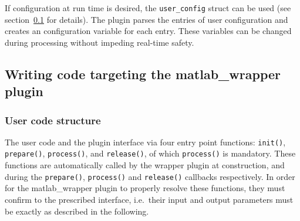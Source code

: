 \documentclass[11pt,a4paper,twoside]{article}
\newcommand{\+}{\discretionary{\mbox{\scriptsize$\hookleftarrow$}}{}{}}
\begin{document}
If configuration at run time is desired, the \texttt{user\_config}
struct can be used (see section~\ref{subsec:writing_code} for details).
The plugin parses the entries of user configuration and creates an
\mha{} configuration variable for each entry. These variables can be
changed during processing without impeding real-time safety.

\subsection{Writing code targeting the matlab\_wrapper plugin}\label{subsec:writing_code}
\subsubsection{User code structure}\label{subsec:code_structure}
The user code and the plugin interface via four entry point functions:
\texttt{init()}, \texttt{prepare()}, \texttt{process()}, and \texttt{release()}, of which \texttt{process()} is mandatory.
These functions are automatically called by the wrapper plugin at construction, and during the \texttt{prepare()},
\texttt{process()} and \texttt{release()} callbacks respectively.
In order for the matlab\_wrapper plugin to properly resolve these functions, they must confirm to the prescribed interface,
i.e.\ their input and output parameters must be exactly as described in the following.\\
\end{document}
